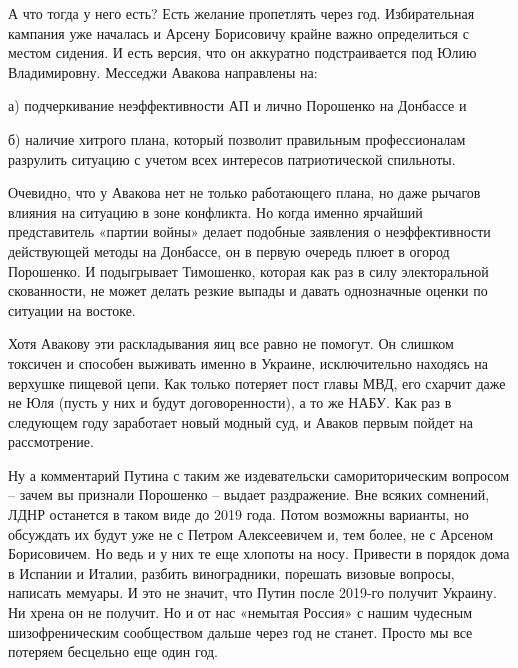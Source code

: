 А что тогда у него есть? Есть желание пропетлять через год. Избирательная
кампания уже началась и Арсену Борисовичу крайне важно определиться с местом
сидения. И есть версия, что он аккуратно подстраивается под Юлию Владимировну.
Месседжи Авакова направлены на:

а) подчеркивание неэффективности АП и лично Порошенко на Донбассе и 

б) наличие хитрого плана, который позволит правильным профессионалам разрулить
ситуацию с учетом всех интересов патриотической спильноты.

Очевидно, что у Авакова нет не только работающего плана, но даже рычагов
влияния на ситуацию в зоне конфликта. Но когда именно ярчайший представитель
«партии войны» делает подобные заявления о неэффективности действующей методы
на Донбассе, он в первую очередь плюет в огород Порошенко. И подыгрывает
Тимошенко, которая как раз в силу электоральной скованности, не может делать
резкие выпады и давать однозначные оценки по ситуации на востоке.

Хотя Авакову эти раскладывания яиц все равно не помогут. Он слишком токсичен и
способен выживать именно в Украине, исключительно находясь на верхушке пищевой
цепи. Как только потеряет пост главы МВД, его схарчит даже не Юля (пусть у них
и будут договоренности), а то же НАБУ. Как раз в следующем году заработает
новый модный суд, и Аваков первым пойдет на рассмотрение.

Ну а комментарий Путина с таким же издевательски самориторическим вопросом –
зачем вы признали Порошенко – выдает раздражение. Вне всяких сомнений, ЛДНР
останется в таком виде до 2019 года. Потом возможны варианты, но обсуждать их
будут уже не с Петром Алексеевичем и, тем более, не с Арсеном Борисовичем. Но
ведь и у них те еще хлопоты на носу. Привести в порядок дома в Испании и
Италии, разбить виноградники, порешать визовые вопросы, написать мемуары. И это
не значит, что Путин после 2019-го получит Украину. Ни хрена он не получит. Но
и от нас «немытая Россия» с нашим чудесным шизофреническим сообществом дальше
через год не станет. Просто мы все потеряем бесцельно еще один год.

